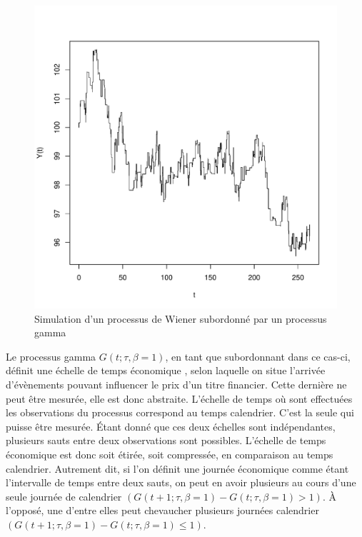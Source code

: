 \begin{figure}[!ht]
  \centering
  \includegraphics[scale=.8]{"./graphiques/CH3-SIMGAMMAGAUSS"}
  \caption{Simulation d'un processus de Wiener subordonné par un
    processus gamma}
  \label{fig:simgammagauss}
\end{figure}

Le processus gamma $G(t;\tau,\beta=1)$, en tant que subordonnant dans
ce cas-ci, définit une échelle de temps économique , selon laquelle
on situe l'arrivée d'évènements pouvant influencer le prix d'un titre
financier. Cette dernière ne peut être mesurée, elle est donc
abstraite. L'échelle de temps où sont effectuées les observations du
processus correspond au temps calendrier. C'est la seule qui
puisse être mesurée. Étant donné que ces deux échelles sont
indépendantes, plusieurs sauts entre deux observations sont possibles.
L'échelle de temps économique est donc soit étirée, soit compressée,
en comparaison au temps calendrier. Autrement dit, si l'on définit
une journée économique comme étant l'intervalle de temps entre deux
sauts, on peut en avoir plusieurs au cours d'une seule journée de
calendrier $(G(t+1;\tau,\beta=1)-G(t;\tau,\beta=1) > 1)$. À l'opposé,
une d'entre elles peut chevaucher plusieurs journées calendrier
$(G(t+1;\tau,\beta=1)-G(t;\tau,\beta=1) \leq 1)$.

